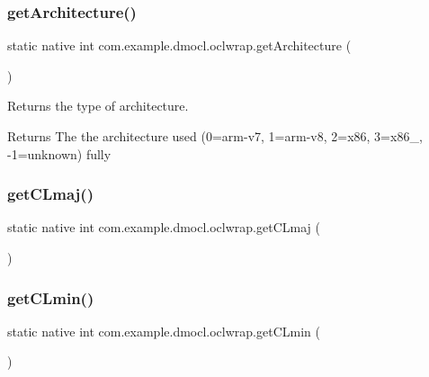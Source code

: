 \subsubsection{\texorpdfstring{get\+Architecture()}{getArchitecture()}}
{\footnotesize\ttfamily static native int com.\+example.\+dmocl.\+oclwrap.\+get\+Architecture (\begin{DoxyParamCaption}{ }\end{DoxyParamCaption})\hspace{0.3cm}{\ttfamily [static]}}

Returns the type of architecture. \begin{DoxyReturn}{Returns}
The the architecture used (0=arm-\/v7, 1=arm-\/v8, 2=x86, 3=x86\+\_, -\/1=unknown)  fully 
\end{DoxyReturn}
\mbox{\label{classcom_1_1example_1_1dmocl_1_1oclwrap_a8d3b11bda003fad87ae98abd2dc20217}} 
\subsubsection{\texorpdfstring{get\+C\+Lmaj()}{getCLmaj()}}
{\footnotesize\ttfamily static native int com.\+example.\+dmocl.\+oclwrap.\+get\+C\+Lmaj (\begin{DoxyParamCaption}{ }\end{DoxyParamCaption})\hspace{0.3cm}{\ttfamily [static]}}

\mbox{\label{classcom_1_1example_1_1dmocl_1_1oclwrap_ab21e9c2f0e53aba97cbe3a9937c9e7bf}} 
\subsubsection{\texorpdfstring{get\+C\+Lmin()}{getCLmin()}}
{\footnotesize\ttfamily static native int com.\+example.\+dmocl.\+oclwrap.\+get\+C\+Lmin (\begin{DoxyParamCaption}{ }\end{DoxyParamCaption})\hspace{0.3cm}{\ttfamily [static]}}

